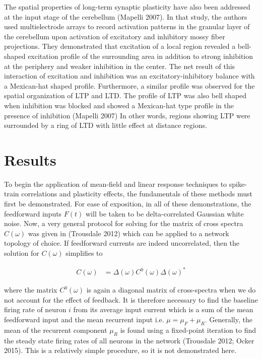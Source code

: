 \documentclass{ucetd}
\begin{document}
The spatial properties of long-term synaptic plasticity have also been addressed at the input stage of the cerebellum (Mapelli 2007). In that study, the authors used multielectrode arrays to record activation patterns in the granular layer of the cerebellum upon activation of excitatory and inhibitory mossy fiber projections. They demonstrated that excitation of a local region revealed a bell-shaped excitation profile of the surrounding area in addition to strong inhibition at the periphery and weaker inhibition in the center. The net result of this interaction of excitation and inhibition was an excitatory-inhibitory balance with a Mexican-hat shaped profile. Furthermore, a similar profile was observed for the spatial organization of LTP and LTD. The profile of LTP was also bell shaped when inhibition was blocked and showed a Mexican-hat type profile in the presence of inhibition (Mapelli 2007) In other words, regions showing LTP were surrounded by a ring of LTD with little effect at distance regions. 

\section{Results}


To begin the application of mean-field and linear response techniques to spike-train correlations and plasticity effects, the fundamentals of these methods must first be demonstrated. For ease of exposition, in all of these demonstrations, the feedforward inputs $F(t)$ will be taken to be delta-correlated Gaussian white noise. Now, a very general protocol for solving for the matrix of cross spectra $C(\omega)$ was given in (Trousdale 2012) which can be applied to a network topology of choice. If feedforward currents are indeed uncorrelated, then the solution for $C(\omega)$ simplifies to 

\begin{align}
C(\omega) &= \Delta(\omega)C^{0}(\omega)\Delta(\omega)^{*}
\end{align}

where the matrix $C^{0}(\omega)$ is again a diagonal matrix of cross-spectra when we do not account for the effect of feedback. It is therefore necessary to find the baseline firing rate of neuron $i$ from its average input current which is a sum of the mean feedforward input and the mean recurrent input i.e. $\mu = \mu_{F} + \mu_{R}$. Generally, the mean of the recurrent component $\mu_{R}$ is found using a fixed-point iteration to find the steady state firing rates of all neurons in the network (Trousdale 2012; Ocker 2015). This is a relatively simple procedure, so it is not demonstrated here. 
\end{document}

